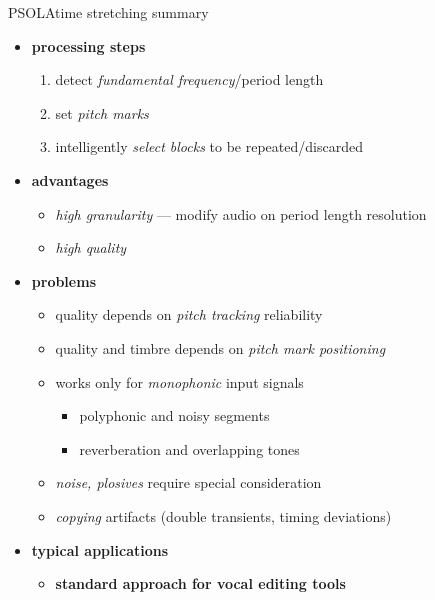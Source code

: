     \begin{frame}{PSOLA}{time stretching summary}
        \begin{itemize}
            \item   \textbf{processing steps}
                \begin{enumerate}
                    \item   detect \textit{fundamental frequency}/period length
                    \item   set \textit{pitch marks}
                    \item   intelligently \textit{select blocks} to be repeated/discarded
                \end{enumerate}
            \pause
            \item   \textbf{advantages}
                \begin{itemize}
                    \item   \textit{high granularity} --- modify audio on period length resolution
                    \item   \textit{high quality}
                \end{itemize}
            \pause
            \item   \textbf{problems}
                \begin{itemize}
                    \item   quality depends on \textit{pitch tracking} reliability
                    \item   quality and timbre depends on \textit{pitch mark positioning}
                    \item   works only for \textit{monophonic} input signals
                        \begin{itemize}
                            \item   polyphonic and noisy segments
                            \item reverberation and overlapping tones
                        \end{itemize}
                   \item    \textit{noise, plosives} require special consideration
                   \item    \textit{copying} artifacts (double transients, timing deviations)
                \end{itemize}
            \pause
            \item   \textbf{typical applications}
                \begin{itemize}
                    \item   \textbf{standard approach for vocal editing tools}
                \end{itemize}
        \end{itemize}
    \end{frame}
